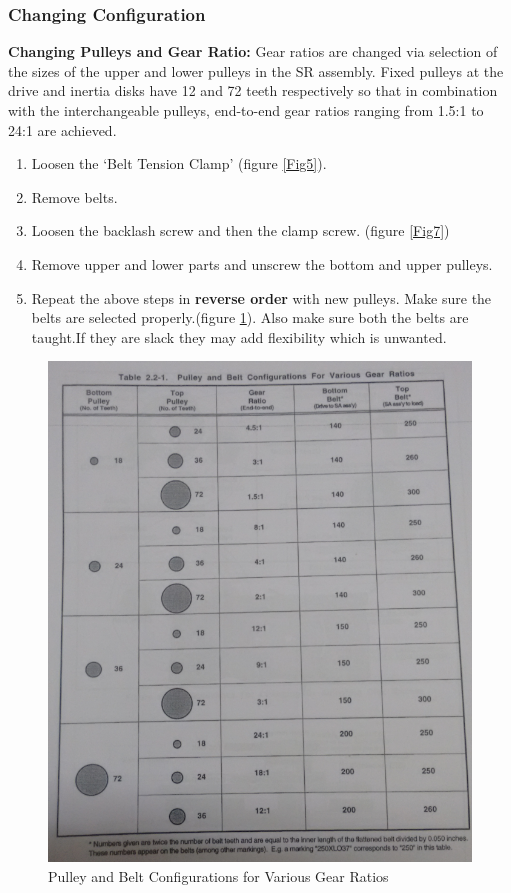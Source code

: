 \documentclass[11pt, a4paper]{article}
\begin{document}
\subsubsection{Changing Configuration}
\textbf{Changing Pulleys and Gear Ratio:} Gear ratios are changed via selection of the sizes of the upper and lower pulleys in the SR assembly. Fixed pulleys at the drive and inertia disks have 12 and 72 teeth respectively so that in combination with the interchangeable pulleys, end-to-end gear ratios ranging from 1.5:1 to 24:1 are achieved.
\begin{enumerate}
\item Loosen the ‘Belt Tension Clamp’ (figure \ref{Fig5}).
\item Remove belts.
\item Loosen the backlash screw and then the clamp screw. (figure \ref{Fig7})
\item Remove upper and lower parts and unscrew the bottom and upper pulleys.
\item Repeat the above steps in \textbf{reverse order} with new pulleys. Make sure the belts are selected properly.(figure \ref{Fig6}). Also make sure both the belts are taught.If they are slack they may add flexibility which is unwanted.
\end{enumerate}
\begin{figure}[H]
\centering
\includegraphics[width = \textwidth]{pulley_config.png}
\caption{Pulley and Belt Configurations for Various Gear Ratios}
\label{Fig6}
\end{figure}
\end{document}
